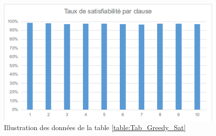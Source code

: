 \begin{figure}[H]
	\includegraphics[width=\textwidth]{images/GreedyUF75Graph.png}
	\caption{Illustration des données de la table \ref{table:Tab_Greedy_Sat}}
\end{figure}


